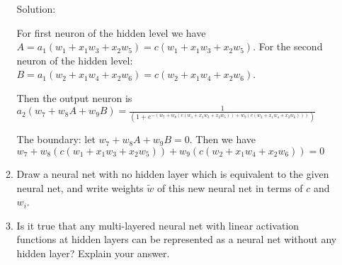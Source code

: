 \documentclass[12pt]{article}
\newcommand{\solu}{{\color{blue} Solution:}}
\begin{document}
\begin{enumerate}
\begin{enumerate}
            \solu 

            For first neuron of the hidden level we have $A = a_1(w_1 + x_1w_3 + x_2w_5) = c(w_1 + x_1w_3 + x_2w_5)$. For the second neuron of the hidden level: $B = a_1(w_2 + x_1w_4 + x_2w_6) = c(w_2 + x_1w_4 + x_2w_6)$. 
            
            Then the output neuron is $a_2(w_7 + w_8A + w_9B) = \frac{1}{(1 + e^{-(w_7 + w_8(c(w_1 + x_1w_3 + x_2w_5)) + w_9(c(w_2 + x_1w_4 + x_2w_6)))})}$

            The boundary: let $w_7 + w_8A + w_9B = 0$.
            Then we have $w_7 + w_8(c(w_1 + x_1w_3 + x_2w_5)) + w_9(c(w_2 + x_1w_4 + x_2w_6)) = 0$
            \item Draw a neural net with no hidden layer which is equivalent to the given neural net, and write weights $\tilde{w}$ of this new neural net in terms of $c$ and $w_i$.
            \item Is it true that any multi-layered neural net with linear activation functions at hidden layers can be represented as a neural net without any hidden layer? Explain your answer.
                        
        \end{enumerate}
    \end{enumerate}
\end{document}
